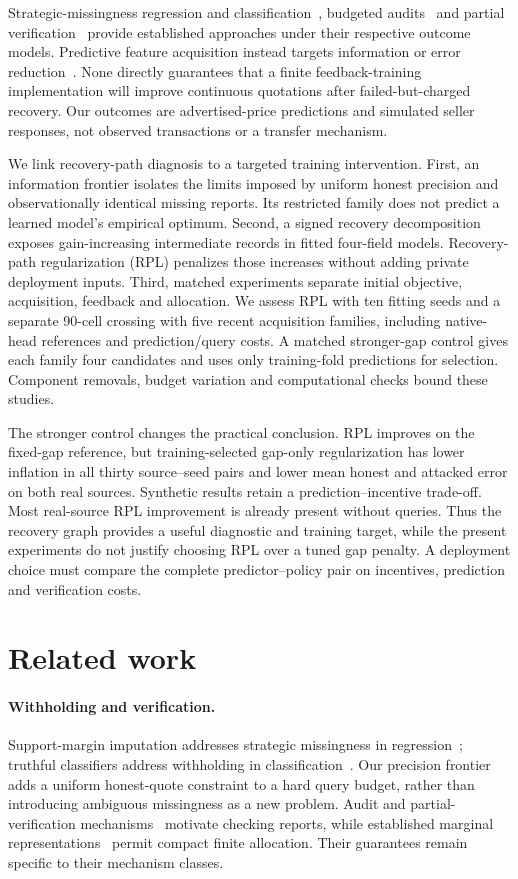 \documentclass[11pt]{article}
\begin{document}
Strategic-missingness regression and classification~\cite{smi,withheld},
budgeted audits~\cite{audits} and partial verification~\cite{partial} provide
established approaches under their respective outcome models. Predictive
feature acquisition instead targets information or error reduction~\cite{activeoracle}.
None directly guarantees that a finite feedback-training implementation will
improve continuous quotations after failed-but-charged recovery. Our outcomes
are advertised-price predictions and simulated seller responses, not observed
transactions or a transfer mechanism.

We link recovery-path diagnosis to a targeted training intervention.
First, an information frontier isolates the limits imposed by uniform honest
precision and observationally identical missing reports. Its restricted family
does not predict a learned model's empirical optimum. Second, a signed
recovery decomposition exposes gain-increasing intermediate records in fitted
four-field models. Recovery-path regularization (RPL) penalizes those increases
without adding private deployment inputs. Third, matched experiments separate
initial objective, acquisition, feedback and allocation. We assess RPL with
ten fitting seeds and a separate 90-cell crossing with five recent acquisition
families, including native-head references and prediction/query costs.
A matched stronger-gap control gives each family four candidates and uses only
training-fold predictions for selection. Component removals, budget variation
and computational checks bound these studies.

The stronger control changes the practical conclusion. RPL improves on the
fixed-gap reference, but training-selected gap-only regularization has lower
inflation in all thirty source--seed pairs and lower mean honest and attacked
error on both real sources. Synthetic results retain a prediction--incentive
trade-off. Most real-source RPL improvement is already present without queries.
Thus the recovery graph provides a useful diagnostic and training target,
while the present experiments do not justify choosing RPL over a tuned gap
penalty. A deployment choice must compare the complete predictor--policy pair
on incentives, prediction and verification costs.

\section{Related work}\label{sec:related}
\paragraph{Withholding and verification.}
Support-margin imputation addresses strategic missingness in regression~\cite{smi};
truthful classifiers address withholding in classification~\cite{withheld}.
Our precision frontier adds a uniform honest-quote constraint to a hard query
budget, rather than introducing ambiguous missingness as a new problem.
Audit and partial-verification mechanisms~\cite{audits,partial} motivate
checking reports, while established marginal representations~\cite{marginals}
permit compact finite allocation. Their guarantees remain specific to their
mechanism classes.
\end{document}
